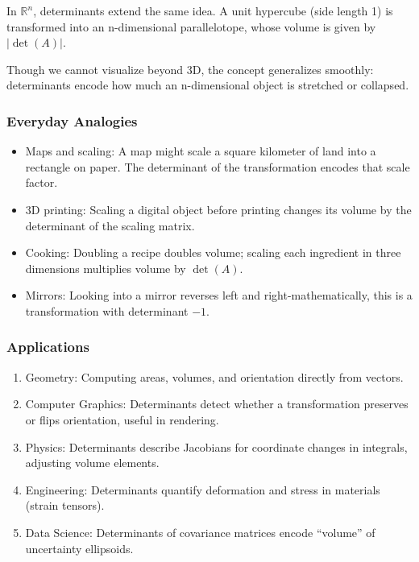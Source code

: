 \documentclass[
  letterpaper,
  DIV=11,
  numbers=noendperiod]{scrreprt}
\providecommand{\tightlist}{%
  \setlength{\itemsep}{0pt}\setlength{\parskip}{0pt}}
\begin{document}
In \(\mathbb{R}^n\), determinants extend the same idea. A unit hypercube
(side length 1) is transformed into an n-dimensional parallelotope,
whose volume is given by \(|\det(A)|\).

Though we cannot visualize beyond 3D, the concept generalizes smoothly:
determinants encode how much an n-dimensional object is stretched or
collapsed.

\subsubsection{Everyday Analogies}\label{everyday-analogies-47}

\begin{itemize}
\tightlist
\item
  Maps and scaling: A map might scale a square kilometer of land into a
  rectangle on paper. The determinant of the transformation encodes that
  scale factor.
\item
  3D printing: Scaling a digital object before printing changes its
  volume by the determinant of the scaling matrix.
\item
  Cooking: Doubling a recipe doubles volume; scaling each ingredient in
  three dimensions multiplies volume by \(\det(A)\).
\item
  Mirrors: Looking into a mirror reverses left and right-mathematically,
  this is a transformation with determinant \(-1\).
\end{itemize}

\subsubsection{Applications}\label{applications-13}

\begin{enumerate}
\def\labelenumi{\arabic{enumi}.}
\tightlist
\item
  Geometry: Computing areas, volumes, and orientation directly from
  vectors.
\item
  Computer Graphics: Determinants detect whether a transformation
  preserves or flips orientation, useful in rendering.
\item
  Physics: Determinants describe Jacobians for coordinate changes in
  integrals, adjusting volume elements.
\item
  Engineering: Determinants quantify deformation and stress in materials
  (strain tensors).
\item
  Data Science: Determinants of covariance matrices encode ``volume'' of
  uncertainty ellipsoids.
\end{enumerate}
\end{document}
